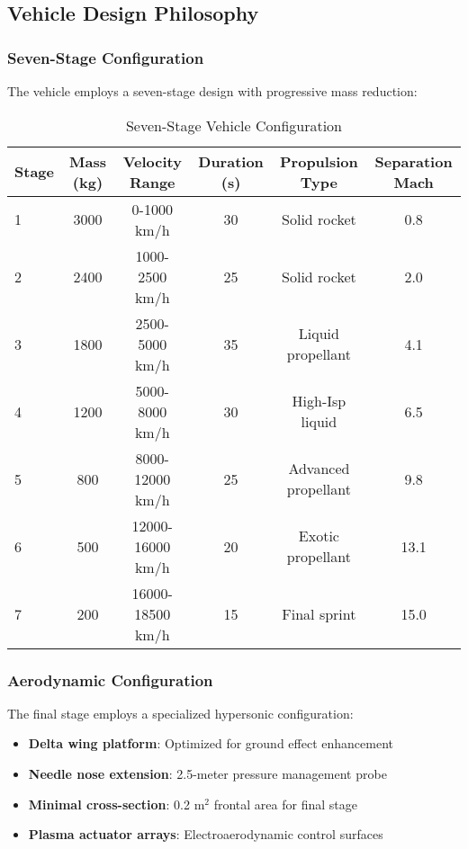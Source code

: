 \documentclass[12pt,a4paper]{article}
\begin{document}
\subsection{Vehicle Design Philosophy}

\subsubsection{Seven-Stage Configuration}
The vehicle employs a seven-stage design with progressive mass reduction:

\begin{table}[H]
\centering
\caption{Seven-Stage Vehicle Configuration}
\label{tab:vehicle_stages}
\begin{tabular}{lccccc}
\toprule
Stage & Mass (kg) & Velocity Range & Duration (s) & Propulsion Type & Separation Mach \\
\midrule
1 & 3000 & 0-1000 km/h & 30 & Solid rocket & 0.8 \\
2 & 2400 & 1000-2500 km/h & 25 & Solid rocket & 2.0 \\
3 & 1800 & 2500-5000 km/h & 35 & Liquid propellant & 4.1 \\
4 & 1200 & 5000-8000 km/h & 30 & High-Isp liquid & 6.5 \\
5 & 800 & 8000-12000 km/h & 25 & Advanced propellant & 9.8 \\
6 & 500 & 12000-16000 km/h & 20 & Exotic propellant & 13.1 \\
7 & 200 & 16000-18500 km/h & 15 & Final sprint & 15.0 \\
\bottomrule
\end{tabular}
\end{table}

\subsubsection{Aerodynamic Configuration}
The final stage employs a specialized hypersonic configuration:

\begin{itemize}
\item \textbf{Delta wing platform}: Optimized for ground effect enhancement
\item \textbf{Needle nose extension}: 2.5-meter pressure management probe
\item \textbf{Minimal cross-section}: 0.2 m$^2$ frontal area for final stage
\item \textbf{Plasma actuator arrays}: Electroaerodynamic control surfaces
\end{itemize}
\end{document}
